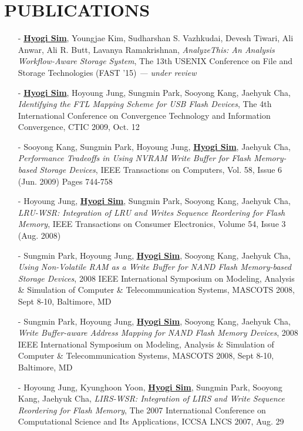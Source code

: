 \section{PUBLICATIONS} 
\begin{itemize}[leftmargin=*]
\setlength\itemsep{-0.02in}
\item[-] \underline{\bf Hyogi Sim}, Youngjae Kim, Sudharshan S. Vazhkudai,
  Devesh Tiwari, Ali Anwar, Ali R. Butt, Lavanya Ramakrishnan,
  {\it AnalyzeThis: An Analysis Workflow-Aware Storage System},
  The 13th USENIX Conference on File and Storage Technologies (FAST '15)
  {\it \small --- under review}
\item[-] \underline{\bf Hyogi Sim}, Hoyoung Jung, Sungmin Park, Sooyong Kang, Jaehyuk Cha,
  {\it Identifying the FTL Mapping Scheme for USB Flash Devices},
  The 4th International Conference on Convergence Technology
  and Information Convergence, CTIC 2009, Oct. 12
\item[-] Sooyong Kang, Sungmin Park, Hoyoung Jung, \underline{\bf Hyogi Sim}, Jaehyuk Cha,
  {\it Performance Tradeoffs in Using NVRAM Write Buffer for Flash Memory-based
  Storage Devices},
  IEEE Transactions on Computers, Vol. 58, Issue 6 (Jun. 2009) Pages 744-758
\item[-] Hoyoung Jung, \underline{\bf Hyogi Sim}, Sungmin Park, Sooyong Kang, Jaehyuk Cha,
 {\it LRU-WSR: Integration of LRU and Writes Sequence Reordering for Flash
 Memory},
 IEEE Transactions on Consumer Electronics, Volume 54, Issue 3 (Aug. 2008)
\item[-] Sungmin Park, Hoyoung Jung, \underline{\bf Hyogi Sim}, Sooyong Kang, Jaehyuk Cha,
 {\it Using Non-Volatile RAM as a Write Buffer for NAND Flash Memory-based
 Storage Devices},
 2008 IEEE International Symposium on Modeling, Analysis \& Simulation of
 Computer \& Telecommunication Systems, MASCOTS 2008, Sept 8-10, Baltimore, MD
\item[-] Sungmin Park, Hoyoung Jung, \underline{\bf Hyogi Sim}, Sooyong Kang, Jaehyuk Cha,
 {\it Write Buffer-aware Address Mapping for NAND Flash Memory Devices},
 2008 IEEE International Symposium on Modeling, Analysis \& Simulation of
 Computer \& Telecommunication Systems, MASCOTS 2008, Sept 8-10, Baltimore, MD
\item[-] Hoyoung Jung, Kyunghoon Yoon, \underline{\bf Hyogi Sim},
 Sungmin Park, Sooyong Kang, Jaehyuk Cha,
 {\it LIRS-WSR: Integration of LIRS and Write Sequence Reordering for Flash
 Memory},
 The 2007 International Conference on Computational Science and Its
 Applications, ICCSA LNCS 2007, Aug. 29
\end{itemize}

